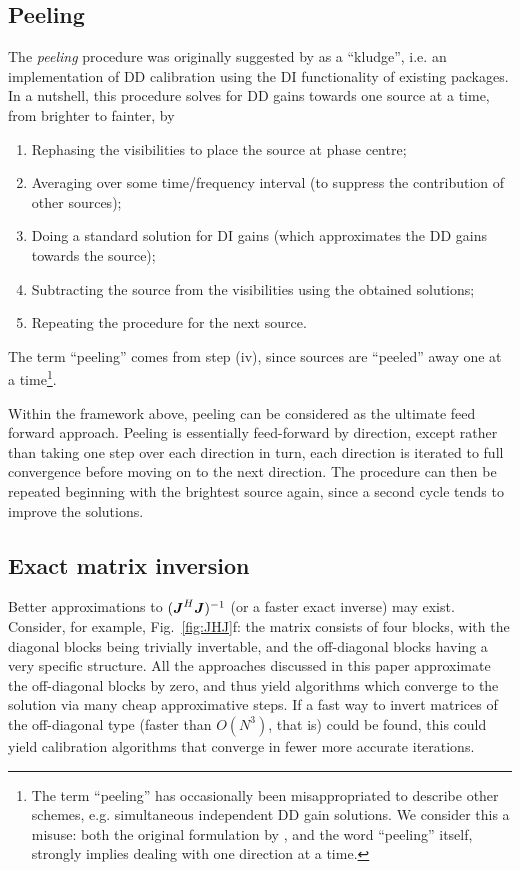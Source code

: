 \documentclass[useAMS,usenatbib]{mn2e}
\newcommand{\mat}[1]{{\bmath{#1}}}
\newcommand{\JJ}{\mat{J}} %
\newcommand{\JHJ}{\JJ^H\JJ} %
\numberwithin{equation}{section} %
\begin{document}
\subsection{Peeling}
\label{sec:peeling}

The \emph{peeling} procedure was originally suggested by \citet{JEN:peeling} as a ``kludge'', i.e. an implementation of DD calibration 
using the DI functionality of existing packages. In a nutshell, this procedure solves for DD gains towards one source at a time, from
brighter to fainter, by

\begin{enumerate}
\item Rephasing the visibilities to place the source at phase centre;
\item Averaging over some time/frequency interval (to suppress the contribution of other sources);
\item Doing a standard solution for DI gains (which approximates the DD gains towards the source);
\item Subtracting the source from the visibilities using the obtained solutions;
\item Repeating the procedure for the next source.
\end{enumerate}

The term ``peeling'' comes from step (iv), since sources are ``peeled'' away one at a time\footnote{The term ``peeling'' has 
occasionally been misappropriated to describe other schemes, e.g. simultaneous independent DD gain solutions. We consider this a 
misuse: both the original formulation by \citet{JEN:peeling}, and the word ``peeling'' itself, strongly implies dealing with 
one direction at a time.}.

Within the framework above, peeling can be considered as the ultimate feed forward approach. Peeling is essentially feed-forward by direction, except rather than taking one step over each direction in turn, each direction is iterated to full convergence before moving on to the next direction. The procedure can then be repeated beginning with the brightest source again, since a second cycle tends to improve the solutions. 

\subsection{Exact matrix inversion}

Better approximations to $(\JHJ)^{-1}$ (or a faster exact inverse) may exist. Consider, for example, Fig.~\ref{fig:JHJ}f: 
the matrix consists of four blocks, with the diagonal blocks being trivially invertable, and the off-diagonal blocks having a 
very specific structure. All the approaches discussed in this paper approximate the off-diagonal blocks by zero, and thus 
yield algorithms which converge to the solution via many cheap approximative steps. If a fast way to invert matrices of the 
off-diagonal type (faster than $O(N^3)$, that is) could be found, this could yield calibration algorithms that converge in fewer 
more accurate iterations.
\end{document}
